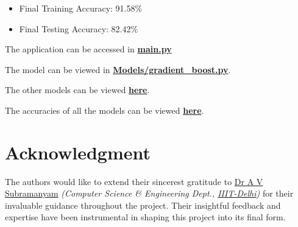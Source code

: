 \documentclass[conference]{IEEEtran}
\begin{document}
    \begin{itemize}
        \item Final Training Accuracy: 91.58\%
        \item Final Testing Accuracy: 82.42\%
    \end{itemize}
    
    The application can be accessed in \href{https://github.com/Vikranth3140/Movie-Revenue-Prediction/blob/main/main.py}{\textbf{main.py}}
    
    The model can be viewed in \href{https://github.com/Vikranth3140/Movie-Revenue-Prediction/blob/main/models/gradient_boost.py}{\textbf{Models/gradient\_boost.py}}.
    
    The other models can be viewed \href{https://github.com/Vikranth3140/Movie-Revenue-Prediction/tree/main/models}{\textbf{here}}.
    
    The accuracies of all the models can be viewed \href{https://github.com/Vikranth3140/Movie-Revenue-Prediction/blob/main/models/accuracies.text}{\textbf{here}}.

\section*{Acknowledgment}
    The authors would like to extend their sincerest gratitude to \href{https://www.iiitd.ac.in/subramanyam}{Dr A V Subramanyam} \textit{(Computer Science \& Engineering Dept., \href{https://www.iiitd.ac.in/}{IIIT-Delhi})} for their invaluable guidance throughout the project.
    Their insightful feedback and expertise have been instrumental in shaping this project into its final form.
\end{document}
